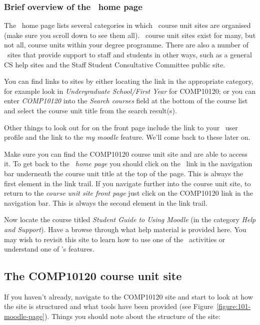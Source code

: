 \subsubsection*{Brief overview of the \moodle\ home page}
\label{sec:brief-overv-moodle}


The \moodle\ home page lists several categories in which \moodle\ course unit sites are organised (make sure you scroll down to see them all). \moodle\ course unit sites exist for many, but not all, course units within your degree programme. There are also a number of \moodle\ sites that provide support to staff and students in other ways, such as a general CS help sites and the Staff Student Consultative Committee public site.

You can find links to sites by either locating the link in the appropriate category, for example look in \emph{Undergraduate School/First Year} for COMP10120; or you can enter \emph{COMP10120} into the \emph{Search courses} field at the bottom of the course list and select the course unit title from the search result(s).

Other things to look out for on the front page include the link to your \moodle\ user profile and the link to the \emph{my moodle} feature. We'll come back to these later on.




Make sure you can find the COMP10120 course unit site and are able to access it. To get back to the \emph{\moodle\ home page} you should click on the \moodle\ link in the navigation bar underneath the course unit title at the top of the page. This is always the first element in the link trail. If you navigate further into the course unit site, to return to the \emph{course unit site front page} just click on the COMP10120 link in the navigation bar. This is always the second element in the link trail.

Now locate the course titled \emph{Student Guide to Using Moodle} (in the category \emph{Help and Support}). Have a browse through what help material is provided here. You may wish to revisit this site to learn how to use one of the \moodle\ activities or understand one of \Moodle's features.

\subsection{The COMP10120 course unit site}
\label{sec:comp10120-course-uni}


If you haven't already, navigate to the COMP10120 site and start to look at how the site is structured and what tools have been provided (see Figure~\ref{figure:101-moodle-page}).
Things you should note about the structure of the site:


